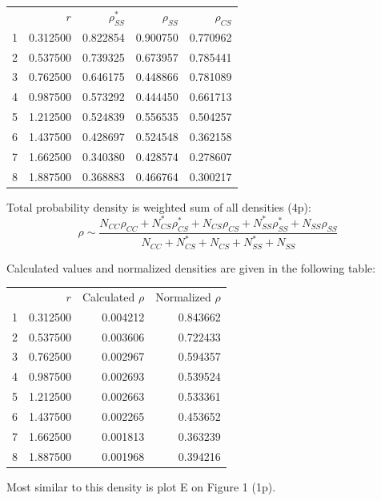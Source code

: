 \begin{description}
  \begin{center}
  \begin{tabular}{rrrrr}
  & $r$ & $\rho^{*}_{SS}$ & $\rho_{SS}$ & $\rho_{CS}$\\
  1 & 0.312500 & 0.822854 & 0.900750 & 0.770962\\
  2 & 0.537500 & 0.739325 & 0.673957 & 0.785441\\
  3 & 0.762500 & 0.646175 & 0.448866 & 0.781089\\
  4 & 0.987500 & 0.573292 & 0.444450 & 0.661713\\
  5 & 1.212500 & 0.524839 & 0.556535 & 0.504257\\
  6 & 1.437500 & 0.428697 & 0.524548 & 0.362158\\
  7 & 1.662500 & 0.340380 & 0.428574 & 0.278607\\
  8 & 1.887500 & 0.368883 & 0.466764 & 0.300217
  \end{tabular}
  \end{center}

\item[(c)] Total probability density is weighted sum of all densities
  (4p):
  \[ \rho \sim \frac{N_{CC}\rho_{CC} + N^{*}_{CS}\rho^{*}_{CS}
     + N_{CS}\rho_{CS} + N^{*}_{SS}\rho^{*}_{SS} + N_{SS}\rho_{SS}}
     {N_{CC} + N^{*}_{CS} + N_{CS} + N^{*}_{SS} + N_{SS}} \]

  Calculated values and normalized densities are given in the following
  table:

  \begin{center}
  \begin{tabular}{rrrr}
  & $r$ & Calculated $\rho$ & Normalized $\rho$\\
  1 & 0.312500 & 0.004212 & 0.843662\\
  2 & 0.537500 & 0.003606 & 0.722433\\
  3 & 0.762500 & 0.002967 & 0.594357\\
  4 & 0.987500 & 0.002693 & 0.539524\\
  5 & 1.212500 & 0.002663 & 0.533361\\
  6 & 1.437500 & 0.002265 & 0.453652\\
  7 & 1.662500 & 0.001813 & 0.363239\\
  8 & 1.887500 & 0.001968 & 0.394216
  \end{tabular}
  \end{center}

  Most similar to this density is plot E on Figure 1 (1p).
\end{description}

